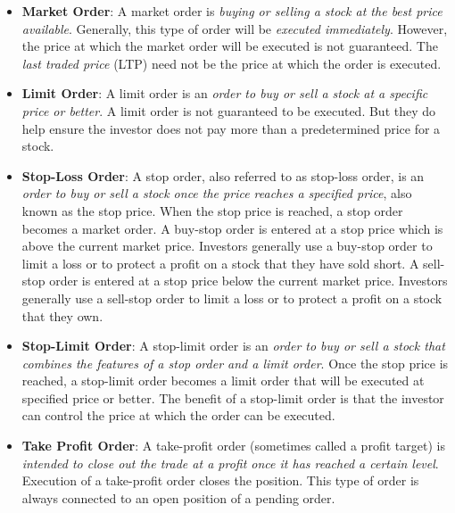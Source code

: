 \begin{itemize}
  \item \textbf{Market Order}: A market order is \emph{buying or selling a stock at the best price available}. Generally, this type of order will be \emph{executed immediately}. However, the price at which the market order will be executed is not guaranteed. The \textit{last traded price} (LTP) need not be the price at which the order is executed.
  \item \textbf{Limit Order}: A limit order is an \emph{order to buy or sell a stock at a specific price or better}.  A limit order is not guaranteed to be executed. But they do help ensure the investor does not pay more than a predetermined price for a stock.
  \item \textbf{Stop-Loss Order}: A stop order, also referred to as stop-loss order, is an \emph{order to buy or sell a stock once the price reaches a specified price}, also known as the stop price. When the stop price is reached, a stop order becomes a market order. A buy-stop order is entered at a stop price which is above the current market price. Investors generally use a buy-stop order to limit a loss or to protect a profit on a stock that they have sold short. A sell-stop order is entered at a stop price below the current market price. Investors generally use a sell-stop order to limit a loss or to protect a profit on a stock that they own.
  \item \textbf{Stop-Limit Order}: A stop-limit order is an \emph{order to buy or sell a stock that combines the features of a stop order and a limit order}. Once the stop price is reached, a stop-limit order becomes a limit order that will be executed at specified price or better. The benefit of a stop-limit order is that the investor can control the price at which the order can be executed.
  \item \textbf{Take Profit Order}: A take-profit order (sometimes called a profit target) is \emph{intended to close out the trade at a profit once it has reached a certain level}. Execution of a take-profit order closes the position. This type of order is always connected to an open position of a pending order.
\end{itemize}


